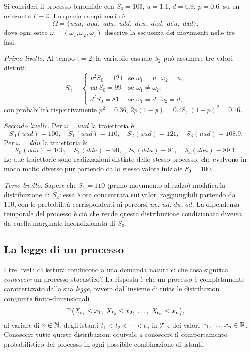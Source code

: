 \begin{example}
\label{es:tre-livelli}
Si consideri il processo binomiale con $S_0=100$, $u=1.1$, $d=0.9$,
$p=0.6$, su un orizzonte $T=3$. Lo spazio campionario \`{e}
\[
\Omega=\{uuu,\;uud,\;udu,\;udd,\;duu,\;dud,\;ddu,\;ddd\},
\]
dove ogni esito $\omega=(\omega_1,\omega_2,\omega_3)$ descrive la
sequenza dei movimenti nelle tre fasi.

\emph{Primo livello.} Al tempo $t=2$, la variabile casuale $S_2$
pu\`{o} assumere tre valori distinti:
\[
S_2=\begin{cases}
u^2 S_0=121 & \text{se }\omega_1=u,\;\omega_2=u,\\
ud\,S_0=99 & \text{se }\omega_1\neq\omega_2,\\
d^2 S_0=81 & \text{se }\omega_1=d,\;\omega_2=d,
\end{cases}
\]
con probabilit\`{a} rispettivamente $p^2=0.36$, $2p(1-p)=0.48$,
$(1-p)^2=0.16$.

\emph{Secondo livello.} Per $\omega=uud$ la traiettoria \`{e}:
\[
S_0(uud)=100,\quad S_1(uud)=110,\quad S_2(uud)=121,\quad
S_3(uud)=108.9.
\]
Per $\omega=ddu$ la traiettoria \`{e}:
\[
S_0(ddu)=100,\quad S_1(ddu)=90,\quad S_2(ddu)=81,\quad
S_3(ddu)=89.1.
\]
Le due traiettorie sono realizzazioni distinte dello stesso processo,
che evolvono in modo molto diverso pur partendo dallo stesso valore
iniziale $S_0=100$.

\emph{Terzo livello.} Sapere che $S_1=110$ (primo movimento al
rialzo) modifica la distribuzione di $S_3$: essa \`{e} ora concentrata
sui valori raggiungibili partendo da 110, con le probabilit\`{a}
corrispondenti ai percorsi $uu$, $ud$, $du$, $dd$. La dipendenza
temporale del processo \`{e} ci\`{o} che rende questa distribuzione
condizionata diversa da quella marginale incondizionata di $S_3$.
\end{example}

\subsection{La legge di un processo}

\noindent
I tre livelli di lettura conducono a una domanda naturale: che cosa
significa \emph{conoscere} un processo stocastico? La risposta \`{e}
che un processo \`{e} completamente caratterizzato dalla sua
\emph{legge}, ovvero dall'insieme di tutte le distribuzioni congiunte
finito-dimensionali
\[
\mathbb{P}\bigl(X_{t_1}\leq x_1,\;X_{t_2}\leq x_2,\;\ldots,\;
X_{t_n}\leq x_n\bigr),
\]
al variare di $n\in\mathbb{N}$, degli istanti $t_1<t_2<\cdots<t_n$ in
$\mathcal{T}$ e dei valori $x_1,\ldots,x_n\in\mathbb{R}$. Conoscere tutte
queste distribuzioni equivale a conoscere il comportamento
probabilistico del processo in ogni possibile combinazione di
istanti.

